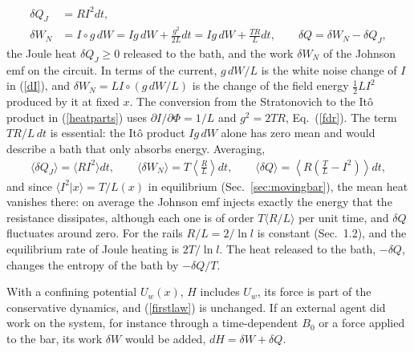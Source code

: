 \documentclass[11pt]{article}
\begin{document}
\begin{align}
  \delta Q_J&=RI^2dt,\nonumber\\
  \delta W_N&=I\circ g\,dW=Ig\,dW+\frac{g^2}{2L}dt=Ig\,dW+\frac{TR}{L}dt,\qquad\delta Q=\delta W_N-\delta Q_J,
  \label{heatparts}
\end{align}
the Joule heat $\delta Q_J\ge0$ released to the bath, and the work $\delta W_N$ of the Johnson emf on the circuit. In terms of the current, $g\,dW/L$ is the white noise change of $I$ in (\ref{dI}), and $\delta W_N=LI\circ(g\,dW/L)$ is the change of the field energy $\frac{1}{2}LI^2$ produced by it at fixed $x$. The conversion from the Stratonovich to the It\^o product in (\ref{heatparts}) uses $\partial I/\partial\Phi=1/L$ and $g^2=2TR$, Eq.~(\ref{fdr}). The term $TR/L\,dt$ is essential: the It\^o product $Ig\,dW$ alone has zero mean and would describe a bath that only absorbs energy. Averaging,
\begin{align}
  \langle\delta Q_J\rangle=\langle RI^2\rangle dt,\qquad\langle\delta W_N\rangle=T\left\langle\frac{R}{L}\right\rangle dt,\qquad\langle\delta Q\rangle=\left\langle R\left(\frac{T}{L}-I^2\right)\right\rangle dt,
\end{align}
and since $\langle I^2|x\rangle=T/L(x)$ in equilibrium (Sec.~\ref{sec:movingbar}), the mean heat vanishes there: on average the Johnson emf injects exactly the energy that the resistance dissipates, although each one is of order $T\langle R/L\rangle$ per unit time, and $\delta Q$ fluctuates around zero. For the rails $R/L=2/\ln l$ is constant (Sec.~1.2), and the equilibrium rate of Joule heating is $2T/\ln l$. The heat released to the bath, $-\delta Q$, changes the entropy of the bath by $-\delta Q/T$.

With a confining potential $U_w(x)$, $H$ includes $U_w$, its force is part of the conservative dynamics, and (\ref{firstlaw}) is unchanged. If an external agent did work on the system, for instance through a time-dependent $B_0$ or a force applied to the bar, its work $\delta W$ would be added, $dH=\delta W+\delta Q$.
\end{document}
